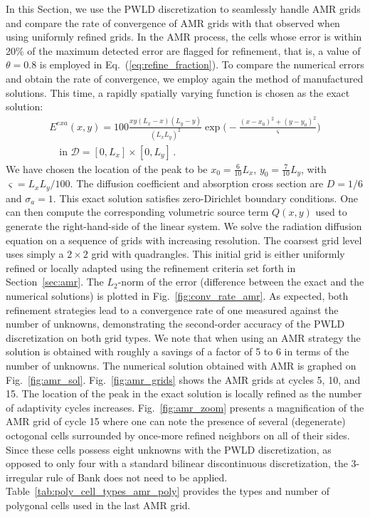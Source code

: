 \documentclass[preprint,10pt]{elsarticle}
\newcommand{\D}{\mathcal{D}}
\newcommand{\eqt}[1]{Eq.~(\ref{#1})}                     %
\newcommand{\fig}[1]{Fig.~\ref{#1}}                      %
\newcommand{\tbl}[1]{Table~\ref{#1}}                     %
\newcommand{\sct}[1]{Section~\ref{#1}}                   %
\begin{document}
In this Section, we use the PWLD discretization to seamlessly handle AMR grids and compare the rate
of convergence of AMR grids with that observed when using uniformly refined grids. In the AMR process, the cells whose
error is within 20\% of the maximum detected error are flagged for refinement, that is, a value of 
$\theta=0.8$ is employed in \eqt{eq:refine_fraction}.
To compare the numerical errors and obtain the rate of convergence, we employ again the method of 
manufactured solutions. This time, a rapidly spatially varying function is chosen
as the exact solution:
%
\begin{multline}
	E^{\textit{exa}}(x,y) = 100 \frac{xy(L_x-x)(L_y-y)}{(L_x L_y)^2}\exp\Big(-\frac{(x-x_0)^2+(y-y_0)^2}{\varsigma}\Big) \\
	 \quad \text{in } \D=[0,L_x]\times [0,L_y] \,.
\end{multline}
%
We have chosen the location of the peak to be $x_0=\tfrac{6}{10}L_x$, $y_0=\tfrac{7}{10}L_y$, with $\varsigma=L_xL_y/100$. 
The diffusion coefficient and absorption cross section are  $D=1/6$ and $\sigma_a=1$. 
This exact solution satisfies zero-Dirichlet boundary conditions. One can then compute 
the corresponding volumetric source term $Q(x,y)$ used to generate the right-hand-side of the linear system. 
We solve the radiation diffusion equation on a sequence of grids with increasing resolution. The coarsest grid level
uses simply a $2\times 2$ grid with quadrangles. This initial grid is either uniformly refined or locally adapted 
using the refinement criteria set forth in \sct{sec:amr}. The $L_2$-norm of the error (difference
between the exact and the numerical solutions) is plotted in \fig{fig:conv_rate_amr}. As expected, both refinement
strategies lead to a convergence rate of one measured against the number of unknowns, demonstrating the 
second-order accuracy of the PWLD discretization on both grid types. We note that when using an AMR strategy 
the solution is obtained with roughly a savings of
a factor of 5 to 6 in terms of the number of unknowns. 
The numerical solution obtained with AMR is graphed on \fig{fig:amr_sol}.
\fig{fig:amr_grids} shows the AMR grids at cycles 5, 10, and 15. The location of the peak in the exact solution is
locally refined as the number of adaptivity cycles increases. \fig{fig:amr_zoom} presents a magnification of the AMR grid of cycle 15
where one can note the presence of several (degenerate) octogonal cells surrounded by once-more refined neighbors on all 
of their sides. Since these cells possess eight unknowns with the PWLD discretization, as opposed to
only four with a standard bilinear discontinuous discretization, the 3-irregular rule of Bank does not need to be applied.
\tbl{tab:poly_cell_types_amr_poly} provides the types and number of polygonal cells used in the last AMR grid.
 
\end{document}
